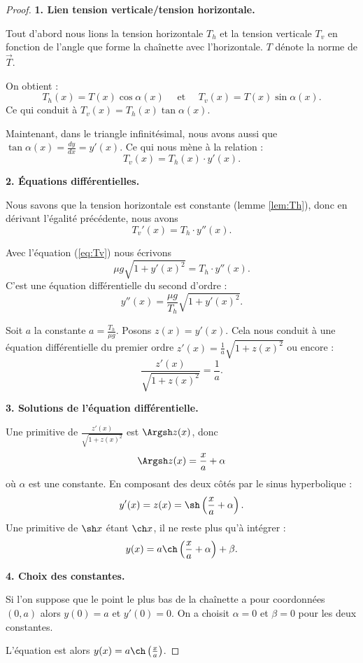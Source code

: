 \documentclass[class=report,crop=false]{standalone}
\begin{document}
\begin{proof}
\textbf{1. Lien tension verticale/tension horizontale.}

Tout d'abord nous lions la tension horizontale $T_h$ et la tension verticale $T_v$ en fonction
de l'angle que forme la chaînette avec l'horizontale. $T$ dénote la norme de $\vec T$.
\shorthandoff{:}
\shorthandon{:}

On obtient :
$$T_h(x) = T(x) \cos \alpha(x)\quad \text{ et } \quad T_v(x) = T(x) \sin \alpha(x).$$
Ce qui conduit à $T_v(x) = T_h(x) \tan \alpha(x)$.

Maintenant, dans le triangle infinitésimal, nous avons aussi que $\tan \alpha(x) = \frac{dy}{dx} = y'(x)$.
\shorthandoff{:}
\shorthandon{:}
Ce qui nous mène à la relation :
$$T_v(x) = T_h(x) \cdot y'(x).$$

\bigskip

\textbf{2. \'Equations différentielles.}

Nous savons que la tension horizontale est constante (lemme \ref{lem:Th}), 
donc en dérivant l'égalité précédente, nous avons
$$T_v'(x) = T_h \cdot y''(x).$$

\bigskip

Avec l'équation (\ref{eq:Tv}) nous écrivons 
$$\mu g \sqrt{1+ y'(x)^2} = T_h \cdot y''(x).$$
C'est une équation différentielle du second d'ordre :
\begin{equation}
\label{eq:diff}
y''(x) = \frac{\mu g}{T_h}  \sqrt{1+ y'(x)^2}.
\end{equation}

\bigskip


Soit $a$ la constante $a =\frac{T_h}{\mu g}$. 
Posons $z(x)= y'(x)$. Cela nous conduit à une équation différentielle
du premier ordre $z'(x) = \frac 1 a \sqrt{1+z(x)^2}$ ou encore :
$$\frac{z'(x)}{\sqrt{1+z(x)^2}} = \frac 1 a.$$

\bigskip

\textbf{3. Solutions de l'équation différentielle.}

Une primitive de $\frac{z'(x)}{\sqrt{1+z(x)^2}}$ est $\Argsh z(x)$,
donc 
$$\Argsh z(x) = \frac x a + \alpha$$
où $\alpha$ est une constante.
En composant des deux côtés par le sinus hyperbolique :
$$y'(x) = z(x) = \sh\left(\frac x a + \alpha\right).$$
Une primitive de $\sh x$ étant $\ch x$,
il ne reste plus qu'à intégrer :
$$y(x) = a \ch \left(\frac x a + \alpha\right) + \beta.$$


\bigskip

\textbf{4. Choix des constantes.}

Si l'on suppose que le point le plus bas de la chaînette a pour coordonnées $(0,a)$ 
alors $y(0)=a$ et $y'(0)=0$. On a choisit $\alpha=0$ et $\beta=0$ pour les deux constantes.
\shorthandoff{:}
\shorthandon{:}


L'équation est alors $y(x) = a \ch \left(\frac x a\right)$.
\end{proof}
\end{document}
